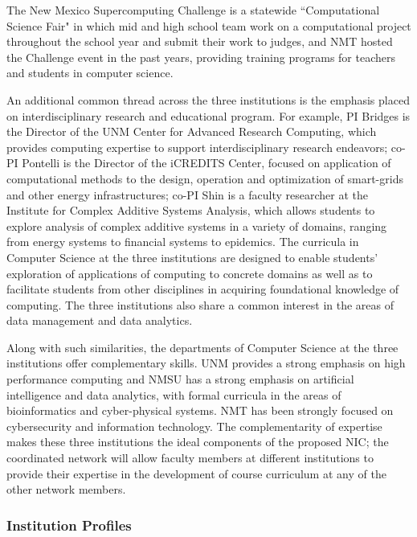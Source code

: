 The New Mexico Supercomputing Challenge is a statewide ``Computational Science Fair" in which mid and high school team work on a computational project throughout the school year and submit their work to judges, and NMT hosted the Challenge event in the past years, providing training programs for teachers and students in computer science.


An additional common thread across the three institutions is the emphasis placed on interdisciplinary research and educational program. For example, PI Bridges is the Director of the UNM Center for Advanced Research Computing, which provides computing expertise to support interdisciplinary research endeavors; co-PI Pontelli is the Director of the iCREDITS Center, focused on application of computational methods to the design, operation and optimization of smart-grids and other energy infrastructures; co-PI Shin is a faculty researcher at the Institute for Complex Additive Systems Analysis, which allows students to explore analysis of complex additive systems in a variety of domains, ranging from energy systems to financial systems to epidemics. The curricula in Computer Science at the three institutions are  designed to enable students' exploration of applications of computing to concrete domains as well as to facilitate students from other disciplines in acquiring foundational knowledge of computing. The three institutions also share a common interest in the areas of data management and data analytics.


Along with such similarities, the departments of Computer Science at the three institutions offer complementary skills. UNM provides a strong emphasis on high performance computing and 
NMSU has a strong emphasis on artificial intelligence and data analytics, with formal curricula in the areas of bioinformatics and cyber-physical systems. 
NMT has been strongly focused on cybersecurity and information technology. The complementarity of expertise makes these three institutions the ideal components of the proposed NIC; the coordinated network will allow faculty members at different institutions to provide their expertise in the development of course curriculum at any of the other network members. 

\subsubsection{Institution Profiles}
